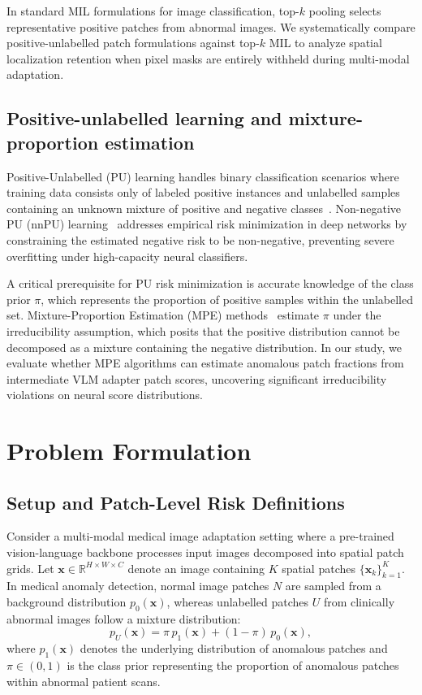 \documentclass[10pt,twocolumn,letterpaper]{article}
\begin{document}
In standard MIL formulations for image classification, top-$k$ pooling selects representative positive patches from abnormal images. We systematically compare positive-unlabelled patch formulations against top-$k$ MIL to analyze spatial localization retention when pixel masks are entirely withheld during multi-modal adaptation.

\subsection{Positive-unlabelled learning and mixture-proportion estimation}
Positive-Unlabelled (PU) learning handles binary classification scenarios where training data consists only of labeled positive instances and unlabelled samples containing an unknown mixture of positive and negative classes~\cite{elkan2008pu}. Non-negative PU (nnPU) learning~\cite{kiryo2017nnpu} addresses empirical risk minimization in deep networks by constraining the estimated negative risk to be non-negative, preventing severe overfitting under high-capacity neural classifiers.

A critical prerequisite for PU risk minimization is accurate knowledge of the class prior $\pi$, which represents the proportion of positive samples within the unlabelled set. Mixture-Proportion Estimation (MPE) methods~\cite{ramaswamy2016mpe} estimate $\pi$ under the irreducibility assumption, which posits that the positive distribution cannot be decomposed as a mixture containing the negative distribution. In our study, we evaluate whether MPE algorithms can estimate anomalous patch fractions from intermediate VLM adapter patch scores, uncovering significant irreducibility violations on neural score distributions.

\section{Problem Formulation}
\label{sec:problem}

\subsection{Setup and Patch-Level Risk Definitions}
Consider a multi-modal medical image adaptation setting where a pre-trained vision-language backbone processes input images decomposed into spatial patch grids. Let $\mathbf{x} \in \mathbb{R}^{H \times W \times C}$ denote an image containing $K$ spatial patches $\{\mathbf{x}_k\}_{k=1}^K$. In medical anomaly detection, normal image patches $N$ are sampled from a background distribution $p_0(\mathbf{x})$, whereas unlabelled patches $U$ from clinically abnormal images follow a mixture distribution:
\begin{equation}
    p_U(\mathbf{x}) = \pi \, p_1(\mathbf{x}) + (1 - \pi) \, p_0(\mathbf{x}),
    \label{eq:mixture_dist}
\end{equation}
where $p_1(\mathbf{x})$ denotes the underlying distribution of anomalous patches and $\pi \in (0, 1)$ is the class prior representing the proportion of anomalous patches within abnormal patient scans.
\end{document}
